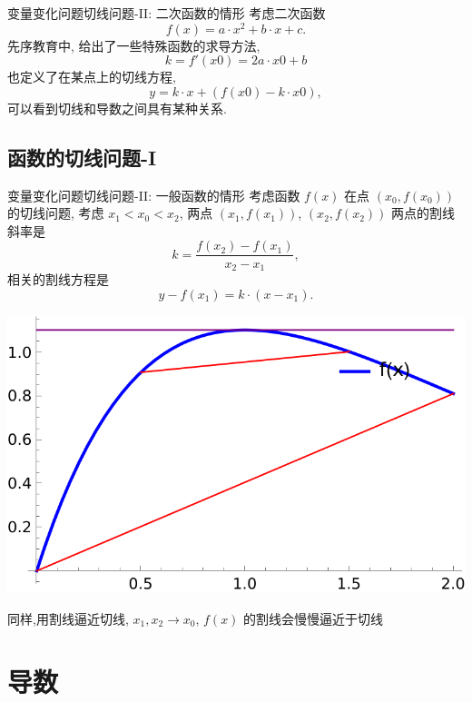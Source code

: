 \documentclass[
10pt,
aspectratio=43,
]{beamer}
\begin{document}
\begin{frame}{变量变化问题}{切线问题-II: 二次函数的情形}
	考虑二次函数
	\[
		f(x) = a\cdot x^2 + b\cdot x +c.
	\]
	先序教育中, 给出了一些特殊函数的求导方法,
	\[
		k = f'(x0) = 2  a \cdot x0 + b
	\]
	也定义了在某点上的切线方程,
	\[
		y = k \cdot x + (f(x0) - k \cdot x0),
	\]
	可以看到切线和导数之间具有某种关系.
\end{frame}

\subsection{函数的切线问题-I} %
\begin{frame}{变量变化问题}{切线问题-II: 一般函数的情形}
	考虑函数 $f(x)$ 在点 $(x_0,f(x_0))$ 的切线问题,
	考虑 $x_1<x_0<x_2$, 两点 $(x_1,f(x_1))$, $(x_2,f(x_2))$ 两点的割线斜率是
	\[
		k=\frac{f(x_2)-f(x_1)}{x_2-x_1},
	\]
	相关的割线方程是
	\[
		y-f(x_1)=k\cdot(x-x_1).
	\]

	\begin{center}
		\includegraphics[scale=0.5]{tangent secant.png}
	\end{center}
	同样,用割线逼近切线, $x_1,x_2\to x_0$, $f(x)$ 的割线会慢慢逼近于切线
\end{frame}

\section{导数}
\end{document}
